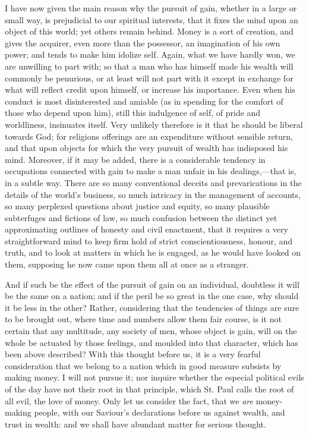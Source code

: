 I have now given the main reason why the pursuit of gain, whether in
a large or small way, is prejudicial to our spiritual interests, that it
fixes the mind upon an object of this world; yet others remain behind.
Money is a sort of creation, and gives the acquirer, even more than the
possessor, an imagination of his own power; and tends to make him
idolize self. Again, what we have hardly won, we are unwilling to part
with; so that a man who has himself made his wealth will commonly be
penurious, or at least will not part with it except in exchange for what
will reflect credit upon himself, or increase his importance. Even when
his conduct is most disinterested and amiable (as in spending for the
comfort of those who depend upon him), still this indulgence of self, of
pride and worldliness, insinuates itself. Very unlikely therefore is it
that he should be liberal towards God; for religions offerings are an
expenditure without sensible return, and that upon objects for which
the
very pursuit of wealth has indisposed his mind. Moreover, if it may be
added, there is a considerable tendency in occupations connected with
gain to make a man unfair in his dealings,—that is, in a subtle way.
There are so many conventional deceits and prevarications in the details
of the world's business, so much intricacy in the management of
accounts, so many perplexed questions about justice and equity, so many
plausible subterfuges and fictions of law, so much confusion between the
distinct yet approximating outlines of honesty and civil enactment, that
it requires a very straightforward mind to keep firm hold of strict
conscientiousness, honour, and truth, and to look at matters in which he
is engaged, as he would have looked on them, supposing he now came upon
them all at once as a stranger.

And if such be the effect of the pursuit of gain on an individual,
doubtless it will be the same on a nation; and if the peril be so great
in the one case, why should it be less in the other? Rather, considering
that the tendencies of things are sure to be brought out, where time and
numbers allow them fair course, is it not certain that any multitude,
any society of men, whose object is gain, will on the whole be actuated
by those feelings, and moulded into that character, which has been above
described? With this thought before us, it is a very fearful
consideration that we belong to a nation which in good measure subsists
by making money. I will not pursue it; nor inquire whether the especial
political evils of the day have not their root in that principle, which
St. Paul calls the root of all evil, the love of money. Only let us
consider the fact, that we \emph{are} money-making people, with our
Saviour's declarations before us against wealth, and trust in wealth:
and we shall have abundant matter for serious thought.

